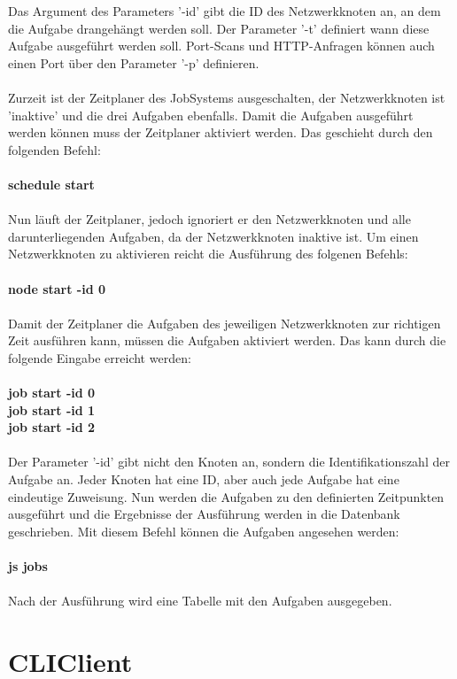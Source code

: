 \documentclass[11pt,a4paper]{report}
\begin{document}
Das Argument des Parameters '-id' gibt die ID des Netzwerkknoten an, an dem die Aufgabe drangehängt werden soll. Der Parameter '-t' definiert wann diese Aufgabe ausgeführt werden soll. Port-Scans und HTTP-Anfragen können auch einen Port über den Parameter '-p' definieren.\\\\
Zurzeit ist der Zeitplaner des JobSystems ausgeschalten, der Netzwerkknoten ist 'inaktive' und die drei Aufgaben ebenfalls. Damit die Aufgaben ausgeführt werden können muss der Zeitplaner aktiviert werden. Das geschieht durch den folgenden Befehl:\\\\
\textbf{schedule start}\\\\
Nun läuft der Zeitplaner, jedoch ignoriert er den Netzwerkknoten und alle darunterliegenden Aufgaben, da der Netzwerkknoten inaktive ist. Um einen Netzwerkknoten zu aktivieren reicht die Ausführung des folgenen Befehls:\\\\
\textbf{node start -id 0}\\\\
Damit der Zeitplaner die Aufgaben des jeweiligen Netzwerkknoten zur richtigen Zeit ausführen kann, müssen die Aufgaben aktiviert werden. Das kann durch die folgende Eingabe erreicht werden:\\\\
\textbf{job start -id 0}\\
\textbf{job start -id 1}\\
\textbf{job start -id 2}\\\\
Der Parameter '-id' gibt nicht den Knoten an, sondern die Identifikationszahl der Aufgabe an. Jeder Knoten hat eine ID, aber auch jede Aufgabe hat eine eindeutige Zuweisung. Nun werden die Aufgaben zu den definierten Zeitpunkten ausgeführt und die Ergebnisse der Ausführung werden in die Datenbank geschrieben. Mit diesem Befehl können die Aufgaben angesehen werden: \\\\
\textbf{js jobs}\\\\
Nach der Ausführung wird eine Tabelle mit den Aufgaben ausgegeben.

\chapter{CLIClient}
\end{document}
